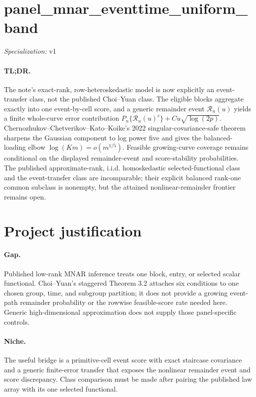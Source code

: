 \documentclass{article}
\begin{document}
\sloppy

\section*{panel\_\allowbreak{}mnar\_\allowbreak{}eventtime\_\allowbreak{}uniform\_\allowbreak{}band}

\noindent\textit{Specialization:} v1\par

\paragraph{TL;DR.} The note's exact-rank, row-heteroskedastic model is now explicitly an event-transfer class, not the published Choi--Yuan class.  The eligible blocks aggregate exactly into one event-by-cell score, and a generic remainder event \(\mathcal R_n(u)\) yields a finite whole-curve error contribution \(P_n\{\mathcal R_n(u)^c\}+Cu\sqrt{\log(2p)}\).  Chernozhukov--Chetverikov--Kato--Koike's 2022 singular-covariance-safe theorem sharpens the Gaussian component to log power five and gives the balanced-loading elbow \(\log(Km)=o(m^{1/5})\).  Feasible growing-curve coverage remains conditional on the displayed remainder-event and score-stability probabilities.  The published approximate-rank, i.i.d. homoskedastic selected-functional class and the event-transfer class are incomparable; their explicit balanced rank-one common subclass is nonempty, but the attained nonlinear-remainder frontier remains open.

\section{Project justification}

\paragraph{Gap.} Published low-rank MNAR inference treats one block, entry, or selected scalar functional.  Choi--Yuan's staggered Theorem 3.2 attaches six conditions to one chosen group, time, and subgroup partition; it does not provide a growing event-path remainder probability or the rowwise feasible-score rate needed here.  Generic high-dimensional approximation does not supply those panel-specific controls.

\paragraph{Niche.} The useful bridge is a primitive-cell event score with exact staircase covariance and a generic finite-error transfer that exposes the nonlinear remainder event and score discrepancy.  Class comparison must be made after pairing the published law array with its one selected functional.
\end{document}

